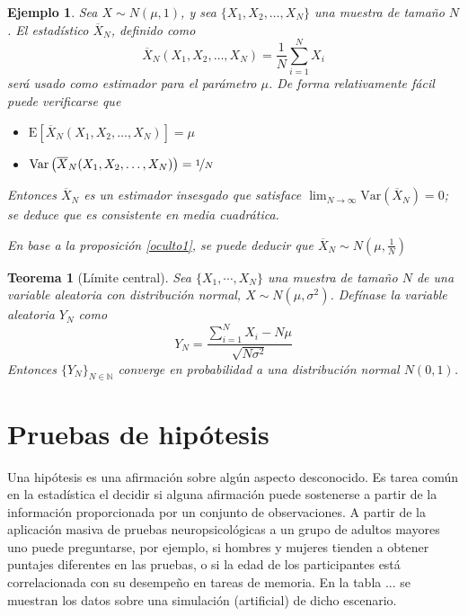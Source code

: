 \documentclass[12pt,letterpaper,draft]{book}
\newtheorem{teorema}{Teorema}[chapter]
\newtheorem{ejemplo}{Ejemplo}[chapter]
\newcommand{\N}{\mathbb{N}}
\newcommand{\E}[1]{\mathrm{E}\left[ #1 \right]}
\newcommand{\Var}[1]{\mathrm{Var}\left( #1 \right)}
\begin{document}
\begin{ejemplo}
Sea $X\sim N(\mu,1)$, y sea $\{ X_1, X_2, \dots, X_N \}$ una muestra de tamaño $N$. El estadístico $\overline{X}_N$, definido como
\begin{equation}
\overline{X}_N (X_1,X_2,\dots,X_N) = \frac{1}{N} \sum_{i=1}^N X_i
\end{equation}
será usado como estimador para el parámetro $\mu$.
%
De forma relativamente fácil puede verificarse que
\begin{itemize}
\item $\E{\overline{X}_N (X_1,X_2,\dots,X_N)} = \mu$
\item $\Var{\overline{X}_N (X_1,X_2,\dots,X_N)} = \nicefrac{1}{N}$
\end{itemize}

Entonces $\overline{X}_N$ es un estimador insesgado que satisface $\lim_{N\rightarrow\infty} \Var{\overline{X}_N}=0$; se deduce que es consistente en media cuadrática.

En base a la proposición \ref{oculto1}, se puede deducir que $\overline{X}_N \sim N\left(\mu,\frac{1}{N}\right)$
\end{ejemplo}

\begin{teorema}[Límite central]
Sea $\{ X_1, \cdots, X_N\}$ una muestra de tamaño $N$ de una variable aleatoria con distribución normal, $X\sim N(\mu,\sigma^{2})$. Defínase la variable aleatoria $Y_N$ como
\begin{equation}
Y_N = \frac{\sum_{i=1}^{N}X_i - N \mu}{\sqrt{N \sigma^{2}}}
\end{equation}
Entonces $\{ Y_N \}_{N \in \N}$ converge en probabilidad a una distribución normal $N(0,1)$.
\end{teorema}



\section{Pruebas de hipótesis}


Una hipótesis es una afirmación sobre algún aspecto desconocido.
%
Es tarea común en la estadística el decidir si alguna afirmación puede sostenerse a partir de la
información proporcionada por un conjunto de observaciones. 
%
A partir de la aplicación masiva de pruebas neuropsicológicas a un grupo de adultos mayores uno 
puede preguntarse, por ejemplo, si hombres y mujeres tienden a obtener puntajes diferentes en las
pruebas, o si la edad de los participantes está correlacionada con su desempeño en tareas de 
memoria.
%
En la tabla ... se muestran los datos sobre una simulación (artificial) de dicho escenario.
\end{document}
